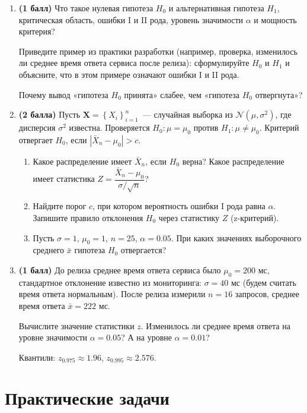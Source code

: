 \documentclass[a4paper,12pt]{article}
\newcommand{\pts}[1]{\textbf{(#1)}}
\begin{document}
\begin{enumerate}
  \item \pts{1 балл} Что такое нулевая гипотеза $H_0$ и альтернативная гипотеза $H_1$, критическая область, ошибки I и II рода, уровень значимости $\alpha$ и мощность критерия?

  Приведите пример из практики разработки (например, проверка, изменилось ли среднее время ответа сервиса после релиза): сформулируйте $H_0$ и $H_1$ и объясните, что в этом примере означают ошибки I и II рода.

  Почему вывод «гипотеза $H_0$ принята» слабее, чем «гипотеза $H_0$ отвергнута»?

  \item \pts{2 балла} Пусть $\mathbf{X}=\left\{X_i\right\}_{i=1}^n$~--- случайная выборка из $\mathcal{N}(\mu,\sigma^2)$, где дисперсия $\sigma^2$ известна. Проверяется $H_0\colon\mu=\mu_0$ против $H_1\colon\mu\ne\mu_0$. Критерий отвергает $H_0$, если $\left|\bar X_n-\mu_0\right|>c$.
  \begin{enumerate}[label=(\asbuk*)]
    \item Какое распределение имеет $\bar X_n$, если $H_0$ верна? Какое распределение имеет статистика $Z=\dfrac{\bar X_n-\mu_0}{\sigma/\sqrt{n}}$?
    \item Найдите порог $c$, при котором вероятность ошибки I рода равна $\alpha$. Запишите правило отклонения $H_0$ через статистику $Z$ (z-критерий).
    \item Пусть $\sigma=1$, $\mu_0=1$, $n=25$, $\alpha=0.05$. При каких значениях выборочного среднего $\bar x$ гипотеза $H_0$ отвергается?
  \end{enumerate}

  \item \pts{1 балл} До релиза среднее время ответа сервиса было $\mu_0=200$ мс, стандартное отклонение известно из мониторинга: $\sigma=40$ мс (будем считать время ответа нормальным). После релиза измерили $n=16$ запросов, среднее время ответа $\bar x=222$ мс.

  Вычислите значение статистики $z$. Изменилось ли среднее время ответа на уровне значимости $\alpha=0.05$? А на уровне $\alpha=0.01$?

  Квантили: $z_{0.975}\approx1.96$, $z_{0.995}\approx2.576$.

\end{enumerate}

\section*{Практические задачи}
\end{document}
